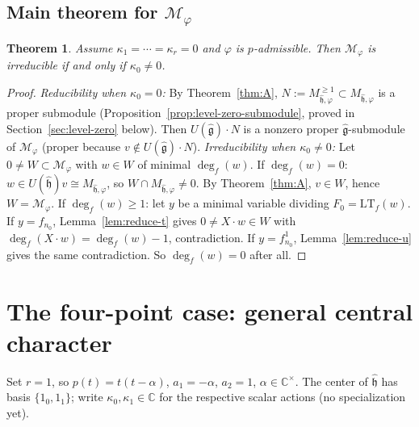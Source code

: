 \documentclass{amsart}
\newcommand{\Cx}{\mathbb{C}}
\newcommand{\g}{\mathfrak{g}}
\newcommand{\h}{\mathfrak{h}}
\newcommand{\wh}[1]{\widehat{#1}}
\newcommand{\whg}{\wh{\g}}
\newcommand{\whh}{\wh{\h}}
\newtheorem{theorem}{Theorem}[section]
\theoremstyle{definition}
\theoremstyle{remark}
\numberwithin{equation}{section}
\begin{document}
\subsection{Main theorem for $\mathcal M_\varphi$}
\begin{theorem}\label{thm:B}
Assume $\kappa_1=\cdots=\kappa_r=0$ and $\varphi$ is $p$-admissible.
Then $\mathcal M_\varphi$ is irreducible if and only if $\kappa_0\neq0$.
\end{theorem}
\begin{proof}
\emph{Reducibility when $\kappa_0=0$:} By Theorem~\ref{thm:A},
$N:=M_{\whh,\varphi}^{\ge1}\subset M_{\whh,\varphi}$ is a proper
submodule (Proposition~\ref{prop:level-zero-submodule},
proved in Section~\ref{sec:level-zero} below).  Then
$U(\whg)\cdot N$ is a nonzero proper $\whg$-submodule of
$\mathcal M_\varphi$ (proper because $v\notin U(\whg)\cdot N$).
\emph{Irreducibility when $\kappa_0\neq0$:}
Let $0\neq W\subset\mathcal M_\varphi$ with $w\in W$ of minimal
$\deg_f(w)$.
If $\deg_f(w)=0$: $w\in U(\whh)v\cong M_{\whh,\varphi}$, so
$W\cap M_{\whh,\varphi}\neq0$.  By Theorem~\ref{thm:A}, $v\in W$,
hence $W=\mathcal M_\varphi$.
If $\deg_f(w)\ge1$: let $y$ be a minimal variable dividing
$F_0=\mathrm{LT}_f(w)$.  If $y=f_{n_0}$, Lemma~\ref{lem:reduce-t}
gives $0\neq X\cdot w\in W$ with $\deg_f(X\cdot w)=\deg_f(w)-1$,
contradiction.  If $y=f_{n_0}^1$, Lemma~\ref{lem:reduce-u} gives
the same contradiction.  So $\deg_f(w)=0$ after all.
\end{proof}
\section{The four-point case: general central character}\label{sec:r1-general}
Set $r=1$, so $p(t)=t(t-\alpha)$, $a_1=-\alpha$, $a_2=1$,
$\alpha\in\Cx^\times$.  The center of $\whh$ has basis
$\{1_0,1_1\}$; write $\kappa_0,\kappa_1\in\Cx$ for the respective
scalar actions (no specialization yet).
\end{document}
